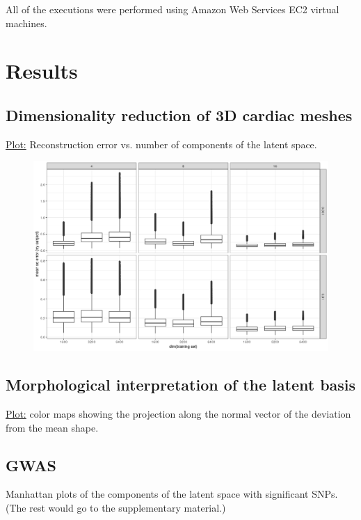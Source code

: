 \documentclass[twocolumn]{llncs}
\begin{document}
All of the executions were performed using Amazon Web Services EC2 virtual machines.

\section{Results}

\subsection{Dimensionality reduction of 3D cardiac meshes}

\underline{Plot:} Reconstruction error vs. number of components of the latent space.

\begin{figure}
\includegraphics[width=\linewidth]{figs/mean_sq_error.png}
\caption{}
\end{figure}

\subsection{Morphological interpretation of the latent basis}
\underline{Plot:} color maps showing the projection along the normal vector of the deviation from the mean shape.


\subsection{GWAS}
Manhattan plots of the components of the latent space with significant SNPs. (The rest would go to the supplementary material.)
\end{document}
